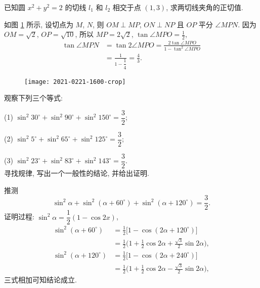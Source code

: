 \endsolution

\begin{exercise}
    已知圆 $x^2 +y^2 =2$ 的切线 $l_1$ 和 $l_2$ 相交于点 $(1,3)$, 求两切线夹角的正切值.
\end{exercise}
\beginsolution
    如图 \ref{fig:2021-0221-1600} 所示, 设切点为 $M$, $N$, 则 $OM\perp MP$, $ON\perp NP$ 且 $OP$ 平分 $\angle MPN$. 因为 $OM=\sqrt2$, $OP= \sqrt{10}$, 所以 $MP= 2\sqrt2$, $\tan\angle MPO= \frac12$,
    \[\begin{aligned}
        \tan\angle MPN
        &= \tan2\angle MPO
         = \frac{2\tan\angle MPO}{1- \tan^2\angle MPO}\\
        &= \frac{1}{1- \dfrac14}
         = \frac43.
    \end{aligned}\]

    \begin{figure}[hb]
        \small\centering
        \texttt{[image: 2021-0221-1600-crop]}
        \caption{}\label{fig:2021-0221-1600}
    \end{figure}
\endsolution

\begin{exercise}
    观察下列三个等式:
    
    (1) $\sin^2 30^\circ+ \sin^2 90^\circ+ \sin^2 150^\circ= \dfrac32$;
    
    (2) $\sin^2 5^\circ+ \sin^2 65^\circ+ \sin^2 125^\circ= \dfrac32$;
    
    (3) $\sin^2 23^\circ+ \sin^2 83^\circ+ \sin^2 143^\circ= \dfrac32$.\\
    寻找规律, 写出一个一般性的结论, 并给出证明.
\end{exercise}
\beginsolution
    推测 
    \[\sin^2 \alpha+ \sin^2 (\alpha+ 60^\circ)
        + \sin^2 (\alpha+ 120^\circ)= \dfrac32.\]
    证明过程: 
    $\sin^2 \alpha= \dfrac12(1- \cos2x)$,
    \[\begin{aligned}
        \sin^2 (\alpha+ 60^\circ)
        &= \frac12\biggl[1- \cos(2\alpha+ 120^\circ)\biggr]\\
        &= \frac12\biggl(1+ \frac12\cos2\alpha+ \frac{\sqrt3}2\sin2\alpha\biggr),\\
        \sin^2 (\alpha+ 120^\circ)
        &= \frac12\biggl[1- \cos(2\alpha+ 240^\circ)\biggr]\\
        &= \frac12\biggl(1+ \frac12\cos2\alpha- \frac{\sqrt3}2\sin2\alpha\biggr),
    \end{aligned}\]
    三式相加可知结论成立.
\endsolution

